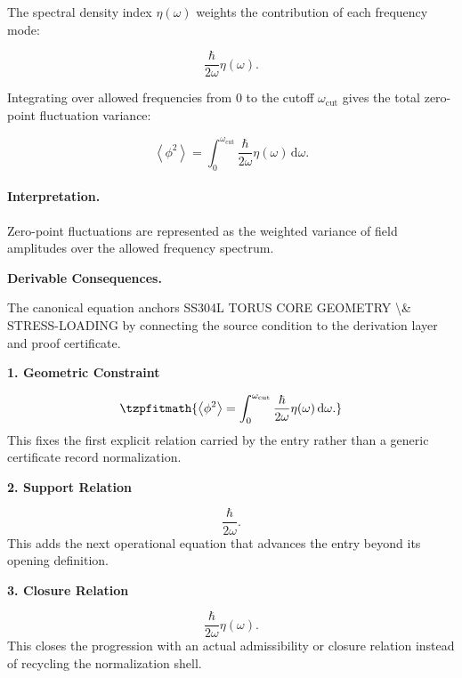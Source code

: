 The spectral density index $\eta(\omega)$ weights the contribution of each frequency mode:

\begin{equation}
\frac{\hbar}{2\omega}\eta(\omega).
\end{equation}

Integrating over allowed frequencies from $0$ to the cutoff $\omega_{\mathrm{cut}}$ gives the total zero-point fluctuation variance:

\begin{equation}
\boxed{
\left\langle\phi^2\right\rangle
=
\int_{0}^{\omega_{\mathrm{cut}}}
\frac{\hbar}{2\omega}
\eta(\omega)
\,\mathrm{d}\omega .
}
\end{equation}

\paragraph{Interpretation.}
Zero-point fluctuations are represented as the weighted variance of field amplitudes over the allowed frequency spectrum.

\par\vspace{0.35em}
\noindent\textbf{Derivable Consequences.}\quad
\begingroup
\footnotesize
\raggedright
The canonical equation anchors SS304L TORUS CORE GEOMETRY \textbackslash{}\& STRESS-LOADING by connecting the source condition to the derivation layer and proof certificate.
\par\endgroup

\noindent\textbf{1. Geometric Constraint}\par
\[
\tzpfitmath{\left\langle\phi^2\right\rangle = \int_{0}^{\omega_{\mathrm{cut}}} \frac{\hbar}{2\omega} \eta(\omega) \,\mathrm{d}\omega.}
\]
\noindent This fixes the first explicit relation carried by the entry rather than a generic certificate record normalization.\par
\noindent\textbf{2. Support Relation}\par
\[
\frac{\hbar}{2\omega}.
\]
\noindent This adds the next operational equation that advances the entry beyond its opening definition.\par
\noindent\textbf{3. Closure Relation}\par
\[
\frac{\hbar}{2\omega}\eta(\omega).
\]
\noindent This closes the progression with an actual admissibility or closure relation instead of recycling the normalization shell.\par

